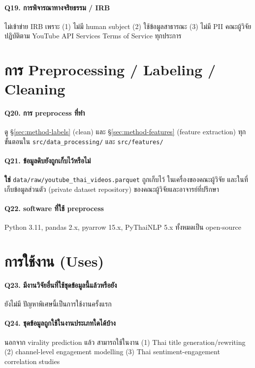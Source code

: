 \paragraph{Q19. การพิจารณาทางจริยธรรม / IRB}
ไม่เข้าข่าย IRB เพราะ (1) ไม่มี human subject (2) ใช้ข้อมูลสาธารณะ (3) ไม่มี
PII คณะผู้วิจัยปฏิบัติตาม YouTube API Services Terms of Service ทุกประการ

\section{การ Preprocessing / Labeling / Cleaning}

\paragraph{Q20. การ preprocess ที่ทำ}
ดู \S\ref{sec:method-labels} (clean) และ \S\ref{sec:method-features}
(feature extraction) ทุกขั้นตอนใน \texttt{src/data\_processing/} และ
\texttt{src/features/}

\paragraph{Q21. ข้อมูลดิบยังถูกเก็บไว้หรือไม่}
\textbf{ใช่} \texttt{data/raw/youtube\_thai\_videos.parquet} ถูกเก็บไว้
ในเครื่องของคณะผู้วิจัย และในที่เก็บข้อมูลส่วนตัว (private dataset
repository) ของคณะผู้วิจัยและอาจารย์ที่ปรึกษา

\paragraph{Q22. software ที่ใช้ preprocess}
Python 3.11, pandas 2.x, pyarrow 15.x, PyThaiNLP 5.x ทั้งหมดเป็น
open-source

\section{การใช้งาน (Uses)}

\paragraph{Q23. มีงานวิจัยอื่นที่ใช้ชุดข้อมูลนี้แล้วหรือยัง}
ยังไม่มี ปัญหาพิเศษนี้เป็นการใช้งานครั้งแรก

\paragraph{Q24. ชุดข้อมูลถูกใช้ในงานประเภทใดได้บ้าง}
นอกจาก virality prediction แล้ว สามารถใช้ในงาน (1) Thai title
generation/rewriting (2) channel-level engagement modelling (3) Thai
sentiment-engagement correlation studies


